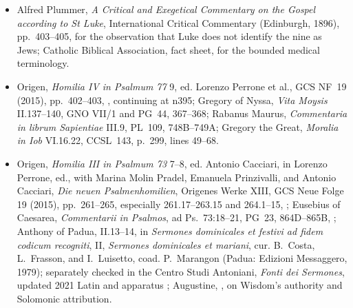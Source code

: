 {\begin{itemize}[leftmargin=1.1em,labelsep=0.35em,itemsep=0em,topsep=0.15em,parsep=0pt]
\item Alfred Plummer, \emph{A Critical and Exegetical Commentary on the
Gospel according to St Luke}, International Critical Commentary (Edinburgh,
1896), pp.~403--405, for the observation that Luke does not identify the nine
as Jews; Catholic Biblical Association,
 fact sheet, for the bounded medical terminology.

\item Origen, \emph{Homilia IV in Psalmum 77} 9, ed. Lorenzo Perrone et al.,
GCS NF~19 (2015), pp.~402--403,
, continuing at n395;
Gregory of Nyssa, \emph{Vita Moysis} II.137--140, GNO VII/1 and
PG~44, 367--368; Rabanus Maurus, \emph{Commentaria in librum Sapientiae}
III.9, PL~109, 748B--749A; Gregory the Great, \emph{Moralia in Iob}
VI.16.22, CCSL~143, p.~299, lines 49--68.

\item Origen, \emph{Homilia III in Psalmum 73} 7--8, ed. Antonio
Cacciari, in Lorenzo Perrone, ed., with Marina Molin Pradel, Emanuela
Prinzivalli, and Antonio Cacciari, \emph{Die neuen Psalmenhomilien}, Origenes Werke XIII,
GCS Neue Folge 19 (2015), pp.~261--265, especially 261.17--263.15 and
264.1--15, ;
Eusebius of Caesarea, \emph{Commentarii in Psalmos}, ad Ps.~73:18--21,
PG~23, 864D--865B,
;
Anthony of Padua,
II.13--14, in \emph{Sermones dominicales et festivi ad fidem codicum
recogniti}, II, \emph{Sermones dominicales et mariani}, cur. B.~Costa,
L.~Frasson, and I.~Luisetto, coad. P.~Marangon (Padua: Edizioni Messaggero,
1979); separately checked in the
Centro Studi Antoniani, \emph{Fonti dei Sermones}, updated 2021 Latin and
apparatus
;
Augustine,
, on Wisdom's authority and Solomonic attribution.


\end{itemize}}
